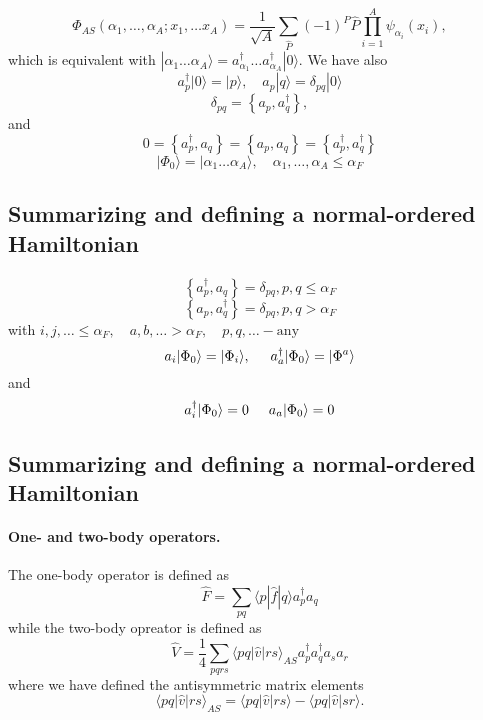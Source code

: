 \documentclass[%
twoside,                 %
final,                   %
10pt]{article}
\begin{document}
\paragraph{}
\[
  \Phi_{AS}(\alpha_1, \dots, \alpha_A; x_1, \dots x_A)=
            \frac{1}{\sqrt{A}} \sum_{\hat{P}} (-1)^P \hat{P} \prod_{i=1}^A \psi_{\alpha_i}(x_i),
\]
which is equivalent with $|\alpha_1 \dots \alpha_A\rangle= a_{\alpha_1}^{\dagger} \dots a_{\alpha_A}^{\dagger} |0\rangle$. We have also
    \[
        a_p^\dagger|0\rangle = |p\rangle, \quad a_p |q\rangle = \delta_{pq}|0\rangle
    \]
\[
  \delta_{pq} = \left\{a_p, a_q^\dagger \right\},
\]
and 
\[
0 = \left\{a_p^\dagger, a_q \right\} = \left\{a_p, a_q \right\} = \left\{a_p^\dagger, a_q^\dagger \right\}
\]
\[
|\Phi_0\rangle = |\alpha_1 \dots \alpha_A\rangle, \quad \alpha_1, \dots, \alpha_A \leq \alpha_F
\]




\subsection{Summarizing and defining a normal-ordered Hamiltonian}

\paragraph{}
\[
\left\{a_p^\dagger, a_q \right\}= \delta_{pq}, p, q \leq \alpha_F 
\]
\[
\left\{a_p, a_q^\dagger \right\} = \delta_{pq}, p, q > \alpha_F
\]
with         $i,j,\ldots \leq \alpha_F, \quad a,b,\ldots > \alpha_F, \quad p,q, \ldots - \textrm{any}$
\[
        a_i|\Phi_0\rangle = |\Phi_i\rangle, \hspace{0.5cm} a_a^\dagger|\Phi_0\rangle = |\Phi^a\rangle
\]
and         
\[
a_i^\dagger|\Phi_0\rangle = 0 \hspace{0.5cm}  a_a|\Phi_0\rangle = 0
\]




\subsection{Summarizing and defining a normal-ordered Hamiltonian}

\paragraph{One- and two-body operators.}
The one-body operator is defined as
\[
 \hat{F} = \sum_{pq} \langle p|\hat{f}|q\rangle a_p^\dagger a_q
\]
while the two-body opreator is defined as
\[
\hat{V} = \frac{1}{4} \sum_{pqrs} \langle pq|\hat{v}|rs\rangle_{AS} a_p^\dagger a_q^\dagger a_s a_r
\]
where we have defined the antisymmetric matrix elements
\[
\langle pq|\hat{v}|rs\rangle_{AS} = \langle pq|\hat{v}|rs\rangle - \langle pq|\hat{v}|sr\rangle.
\]
\end{document}

